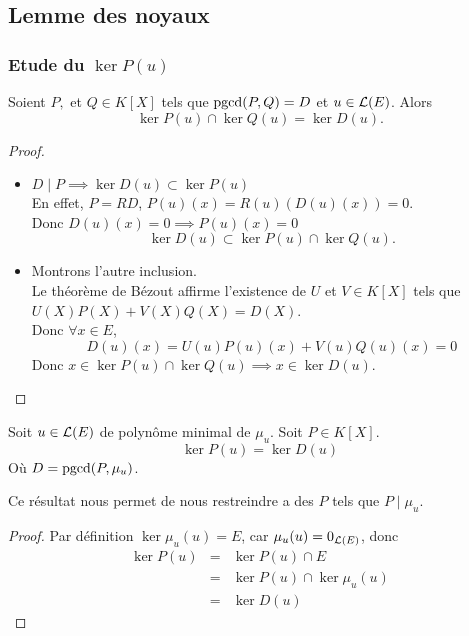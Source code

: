 \subsection{Lemme des noyaux}

\subsubsection{Etude du $\ker P(u)$}


\begin{prop}
	Soient $P,$ et $Q \in K[X]$ tels que $\text{pgcd}(P,Q) = D$ et $u \in \mathcal{L}(E)$.
	Alors
	$$\ker P(u) \cap \ker Q(u) = \ker D(u).$$
\end{prop}

\begin{proof}
	\begin{itemize}
		\item $D \mid P \implies \ker D(u) \subset \ker P(u)$\\
		      En effet, $P = RD$, $P(u)(x) = R(u)(D(u)(x)) = 0$.\\
		      Donc $D(u)(x) = 0 \implies P(u)(x) = 0$
		      $$ \ker D(u) \subset \ker P(u) \cap \ker Q(u).$$

		\item Montrons l'autre inclusion.\\
		      Le théorème de Bézout affirme l'existence de $U$ et $V \in K[X]$ tels que $U(X)P(X) + V(X)Q(X) = D(X)$.\\
		      Donc $\forall x \in E$,
		      $$ D(u)(x) = U(u)P(u)(x) + V(u)Q(u)(x) = 0$$
		      Donc $x \in \ker P(u) \cap \ker Q(u) \implies x \in \ker D(u)$.
	\end{itemize}
\end{proof}

\begin{coro}
	Soit $u \in \mathcal{L}(E)$ de polynôme minimal de $\mu_u$.
	Soit $P \in K[X]$.
	$$\ker P(u) = \ker D(u)$$
	Où $D = \text{pgcd}(P,\mu_u)$.
\end{coro}

\begin{remarque}
	Ce résultat nous permet de nous restreindre a des $P$ tels que $P \mid \mu_u$.
\end{remarque}


\begin{proof}
	Par définition $\ker \mu_u(u) = E$, car $\mu_u(u) = 0_{\mathcal{L}(E)}$, donc
	\begin{eqnarray*}
		\ker P(u)  &=& \ker P(u) \cap E \\
		&=& \ker P(u) \cap \ker \mu_u(u) \\
		&=& \ker D(u)
	\end{eqnarray*}
\end{proof}

